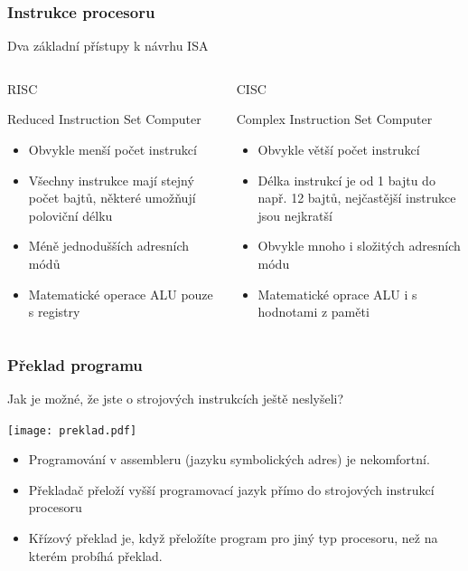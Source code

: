 \documentclass{beamer}
\begin{document}
\begin{frame}
\frametitle{Instrukce procesoru}

Dva základní přístupy k návrhu ISA
\begin{columns}
\begin{column}{0.5\textwidth}
\begin{center}
\LARGE{RISC}
\end{center}
Reduced Instruction Set Computer
\begin{itemize}
\item Obvykle menší počet instrukcí
\item Všechny instrukce mají stejný počet bajtů, některé umožňují poloviční délku
\item Méně jednodušších adresních módů
\item Matematické operace ALU pouze s registry
\end{itemize}
\end{column}
\begin{column}{0.5\textwidth}  
\begin{center}
\LARGE{CISC}
\end{center}
Complex Instruction Set Computer
\begin{itemize}
\item Obvykle větší počet instrukcí
\item Délka instrukcí je od 1 bajtu do např. 12 bajtů, nejčastější instrukce jsou nejkratší
\item Obvykle mnoho i složitých adresních módu
\item Matematické oprace ALU i s hodnotami z paměti
\end{itemize}

\end{column}
\end{columns}
\end{frame}


\begin{frame}
\frametitle{Překlad programu}

Jak je možné, že jste o strojových instrukcích ještě neslyšeli?

\begin{center}
   \texttt{[image: preklad.pdf]}
\end{center}

\begin{itemize}
\item Programování v assembleru (jazyku symbolických adres) je nekomfortní.
\item Překladač přeloží vyšší programovací jazyk přímo do strojových instrukcí procesoru
\item Křízový překlad je, když přeložíte program pro jiný typ procesoru, než na kterém probíhá překlad.
\end{itemize}
\end{frame}
\end{document}
